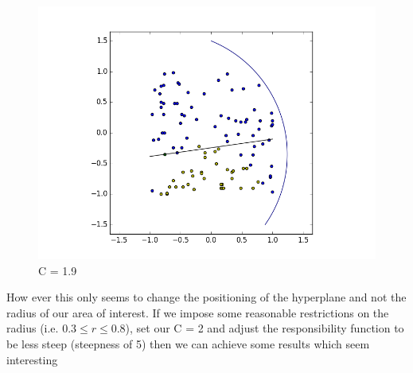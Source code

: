 \documentclass{article}
\theoremstyle{definition}
\begin{document}
\begin{figure}[H]
\begin{minipage}[b]{0.49\textwidth}
    \includegraphics[width=\textwidth]{BoundaryHunter-Attempt3-04.png}
    \caption{C = 1.9}
  \end{minipage}
\end{figure}

How ever this only seems to change the positioning of the hyperplane and not the radius of our area of interest. If we impose some reasonable restrictions on the radius (i.e. $0.3 \leq r \leq 0.8$), set our C = 2 and adjust the responsibility function to be less steep (steepness of 5) then we can achieve some results which seem interesting
\end{document}

